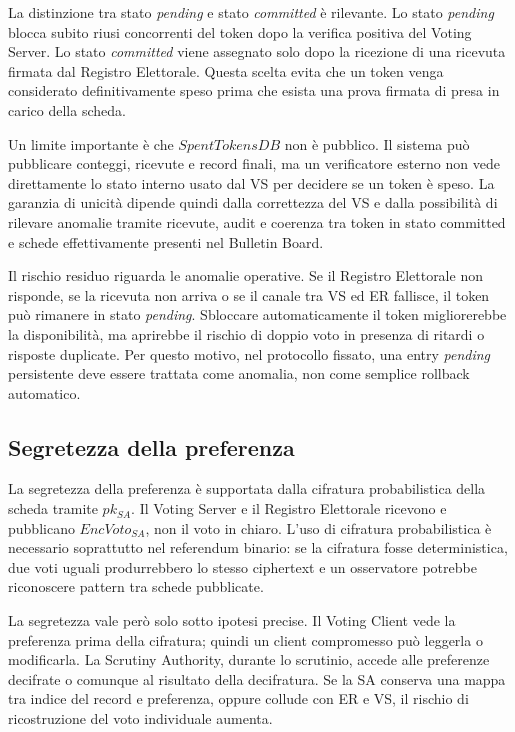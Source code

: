 \documentclass[a4paper,12pt]{article}
\begin{document}
La distinzione tra stato \emph{pending} e stato \emph{committed} è rilevante.
Lo stato \emph{pending} blocca subito riusi concorrenti del token dopo la verifica positiva del Voting Server.
Lo stato \emph{committed} viene assegnato solo dopo la ricezione di una ricevuta firmata dal Registro Elettorale.
Questa scelta evita che un token venga considerato definitivamente speso prima che esista una prova firmata di presa in carico della scheda.

Un limite importante è che \(SpentTokensDB\) non è pubblico. Il sistema può pubblicare conteggi, ricevute e record finali, ma un verificatore esterno non vede direttamente lo stato interno usato dal VS per decidere se un token è speso. La garanzia di unicità dipende quindi dalla correttezza del VS e dalla possibilità di rilevare anomalie tramite ricevute, audit e coerenza tra token in stato committed e schede effettivamente presenti nel Bulletin Board.

Il rischio residuo riguarda le anomalie operative.
Se il Registro Elettorale non risponde, se la ricevuta non arriva o se il canale tra VS ed ER fallisce, il token può rimanere in stato \emph{pending}.
Sbloccare automaticamente il token migliorerebbe la disponibilità, ma aprirebbe il rischio di doppio voto in presenza di ritardi o risposte duplicate.
Per questo motivo, nel protocollo fissato, una entry \emph{pending} persistente deve essere trattata come anomalia, non come semplice rollback automatico.

\subsection{Segretezza della preferenza}

La segretezza della preferenza è supportata dalla cifratura probabilistica della scheda tramite \(pk_{SA}\).
Il Voting Server e il Registro Elettorale ricevono e pubblicano \(EncVoto_{SA}\), non il voto in chiaro.
L'uso di cifratura probabilistica è necessario soprattutto nel referendum binario: se la cifratura fosse deterministica, due voti uguali produrrebbero lo stesso ciphertext e un osservatore potrebbe riconoscere pattern tra schede pubblicate.

La segretezza vale però solo sotto ipotesi precise.
Il Voting Client vede la preferenza prima della cifratura; quindi un client compromesso può leggerla o modificarla.
La Scrutiny Authority, durante lo scrutinio, accede alle preferenze decifrate o comunque al risultato della decifratura.
Se la SA conserva una mappa tra indice del record e preferenza, oppure collude con ER e VS, il rischio di ricostruzione del voto individuale aumenta.
\end{document}
